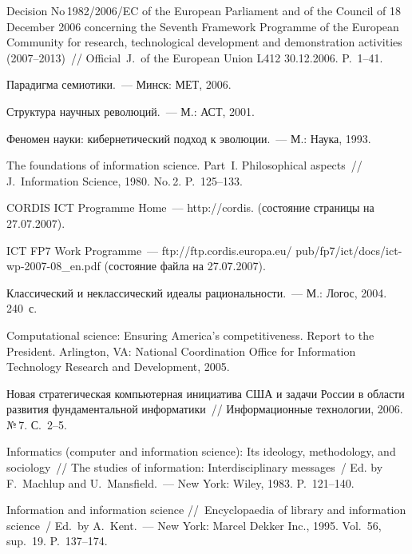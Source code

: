 \begin{multicols}{2}
{{\begin{thebibliography}{99}
     Decision No\,1982/2006/EC of the European Parliament and of the Council of 18 December
2006 concerning the Seventh Framework Programme of the European Community for research,
technological development and demonstration activities (2007--2013)~// Official\ 
J.\ of the European
Union L412 30.12.2006. P.~1--41.

      Парадигма семиотики.~--- Минск: МЕТ, 2006.

     Структура научных революций.~--- М.: АСТ, 2001.

     Феномен науки: кибернетический подход к эволюции.~--- М.: Наука, 1993.

      The foundations of information science. Part~I. Philosophical aspects~// J.\  Information
Science, 1980. No.\,2. P.~125--133.

     CORDIS ICT Programme Home~--- {\sf http://cordis.} (состояние страницы на 27.07.2007).

     ICT FP7 Work Programme~---
     {\sf ftp://ftp.cordis.europa.eu/ pub/fp7/ict/docs/ict-wp-2007-08\_en.pdf} (состояние файла на
27.07.2007).

     Классический и неклассический идеалы рациональности.~--- М.: Логос, 2004. 240~с.

     Computational science: Ensuring America's competitiveness. Report to the President.
Arlington, VA: National Coordination Office for Information Technology Research and Development,
2005.

     Новая стратегическая компьютерная инициатива США и задачи России в области
развития фундаментальной информатики~// Информационные технологии, 2006. №\,7. С.~2--5.

     Informatics (computer and information science): Its ideology, methodology, and sociology~//
The studies of information: Interdisciplinary messages~/ Ed. by F.~Machlup and U.~Mansfield.~---
New York: Wiley, 1983. P.~121--140.

     Information and information science //~Encyclopaedia of library and information science~/
Ed.\ by A.~Kent.~---
New York: Marcel Dekker Inc., 1995. Vol.~56, sup.~19. P.~137--174.


\end{thebibliography}}}
\end{multicols}
